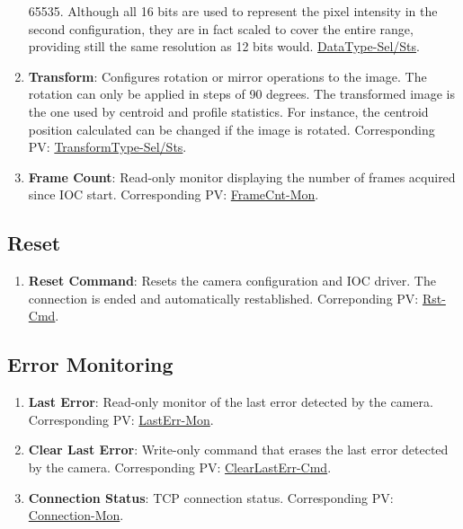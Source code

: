 \documentclass[openany]{article}
\begin{document}
\begin{enumerate}
                        65535. Although all 16 bits are used to represent the pixel 
                        intensity in the second configuration, they are in fact scaled to 
                        cover the entire range, providing still the same resolution as 12 
                        bits would. \hyperlink{pv:data-type}{DataType-Sel/Sts}.
             \item \textbf{Transform}: Configures rotation or mirror operations to 
                        the image. The rotation can only be applied in steps of 90 degrees.
                        The transformed image is the one used by centroid and profile 
                        statistics. For instance, the centroid position calculated can be 
                        changed if the image is rotated. Corresponding PV: 
                        \hyperlink{pv:transf-type}{TransformType-Sel/Sts}.
            \item \textbf{Frame Count}: Read-only monitor displaying the number of 
                        frames acquired since IOC start. Corresponding PV: 
                        \hyperlink{pv:frame-cnt}{FrameCnt-Mon}.
        \end{enumerate}

    \subsection{Reset}\label{sec:reset}

        \begin{enumerate}
            \item \textbf{Reset Command}: Resets the camera configuration and IOC 
                        driver. The connection is ended and automatically restablished. 
                        Correponding PV: \hyperlink{pv:reset}{Rst-Cmd}.
        \end{enumerate}

    \subsection{Error Monitoring}\label{sec:err-mon}

        \begin{enumerate}
            \item \textbf{Last Error}: Read-only monitor of the last error detected
                        by the camera. Corresponding PV: 
                        \hyperlink{pv:last-err}{LastErr-Mon}.
            \item \textbf{Clear Last Error}: Write-only command that erases the last
                        error detected by the camera. Corresponding PV: 
                        \hyperlink{pv:clear-last-err}{ClearLastErr-Cmd}.
            \item \textbf{Connection Status}: TCP connection status. Corresponding 
                        PV: \hyperlink{pv:connection}{Connection-Mon}.
        \end{enumerate}
\end{document}
